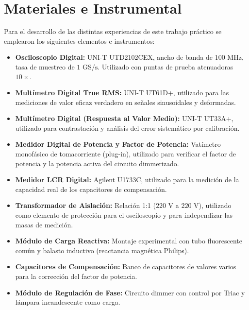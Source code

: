 \chapter{Materiales e Instrumental}
Para el desarrollo de las distintas experiencias de este trabajo práctico se emplearon los siguientes elementos e
instrumentos:

\begin{itemize}
    \item \textbf{Osciloscopio Digital:} UNI-T UTD2102CEX, ancho de banda de $100\text{ MHz}$, tasa de muestreo de
          $1\text{ GS/s}$. Utilizado con puntas de prueba atenuadoras $10\times$.
    \item \textbf{Multímetro Digital True RMS:} UNI-T UT61D+, utilizado para las mediciones de valor eficaz verdadero
          en señales sinusoidales y deformadas.
    \item \textbf{Multímetro Digital (Respuesta al Valor Medio):} UNI-T UT33A+, utilizado para contrastación y análisis
          del error sistemático por calibración.
    \item \textbf{Medidor Digital de Potencia y Factor de Potencia:} Vatímetro monofásico de tomacorriente (plug-in),
          utilizado para verificar el factor de potencia y la potencia activa del circuito dimmerizado.
    \item \textbf{Medidor LCR Digital:} Agilent U1733C, utilizado para la medición de la capacidad real de los
          capacitores de compensación.
    \item \textbf{Transformador de Aislación:} Relación 1:1 ($220\text{ V}$ a $220\text{ V}$), utilizado como elemento de
          protección para el osciloscopio y para independizar las masas de medición.
    \item \textbf{Módulo de Carga Reactiva:} Montaje experimental con tubo fluorescente común y balasto inductivo (reactancia
          magnética Philips).
    \item \textbf{Capacitores de Compensación:} Banco de capacitores de valores varios para la corrección del factor de
          potencia.
    \item \textbf{Módulo de Regulación de Fase:} Circuito dimmer con control por Triac y lámpara incandescente como carga.
\end{itemize}

